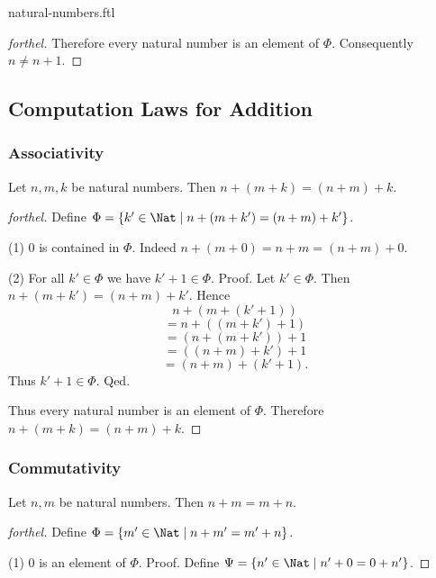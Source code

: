 \documentclass{naproche-library}
\begin{document}
\begin{smodule}{natural-numbers.ftl}
\begin{proof}[forthel]
    Therefore every natural number is an element of $\Phi$.
    Consequently $n \neq n + 1$.
  \end{proof}


  \subsection*{Computation Laws for Addition}

  \subsubsection*{Associativity}

  \begin{proposition}[forthel,id=ARITHMETIC_03_3235893452210176]
    Let $n, m, k$ be natural numbers.
    Then $n + (m + k) = (n + m) + k$.
  \end{proposition}
  \begin{proof}[forthel]
    Define $\Phi = \{ k' \in \Nat \mid n + (m + k') = (n + m) + k' \}$.

    (1) $0$ is contained in $\Phi$.
    Indeed $n + (m + 0) = n + m = (n + m) + 0$.

    (2) For all $k' \in \Phi$ we have $k' + 1 \in \Phi$. \newline
    Proof.
      Let $k' \in \Phi$.
      Then $n + (m + k') = (n + m) + k'$.
      Hence
      \[  n + (m + (k' + 1))        \]
      \[    = n + ((m + k') + 1)    \]
      \[    = (n + (m + k')) + 1    \]
      \[    = ((n + m) + k') + 1    \]
      \[    = (n + m) + (k' + 1).   \]
      Thus $k' + 1 \in \Phi$.
    Qed.

    Thus every natural number is an element of $\Phi$.
    Therefore $n + (m + k) = (n + m) + k$.
  \end{proof}


  \subsubsection*{Commutativity}

  \begin{proposition}[forthel,id=ARITHMETIC_03_4029553232052224]
    Let $n, m$ be natural numbers.
    Then $n + m = m + n$.
  \end{proposition}
  \begin{proof}[forthel]
    Define $\Phi = \{ m' \in \Nat \mid n + m' = m' + n \}$.

    (1) $0$ is an element of $\Phi$. \newline
    Proof.
      Define $\Psi = \{ n' \in \Nat \mid n' + 0 = 0 + n' \}$.


\end{proof}
\end{smodule}
\end{document}
